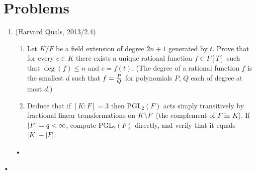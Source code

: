 \section{Problems}%
\begin{enumerate}
\item
(Harvard Quals, 2013/2.4) 
\begin{enumerate}
\item
Let $K/F$ be a field extension of degree $2n+1$ generated by $t$. Prove that for every $c\in K$ there exists a unique rational function $f\in F[T]$ such that $\deg(f)\le n$ and $c=f(t)$. (The degree of a rational function $f$ is the smallest $d$ such that $f=\frac{P}{Q}$ for polynomials $P$, $Q$ each of degree at most $d$.)
\item
Deduce that if $[K:F]=3$ then $\text{PGL}_2(F)$ acts simply transitively by fractional linear transformations on $K\backslash F$ (the complement of $F$ in $K$). If $|F|=q<\infty$, compute $\text{PGL}_2(F)$ directly, and verify that it equals $|K|-|F|$.
\end{enumerate}•
\end{enumerate}•